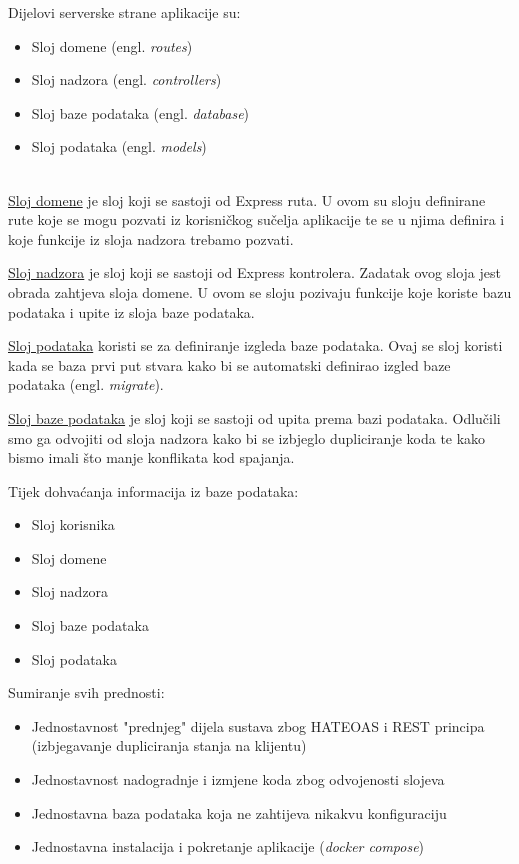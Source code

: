Dijelovi serverske strane aplikacije su:
\begin{itemize}
  \item Sloj domene (engl. \textit{routes})
  \item Sloj nadzora (engl. \textit{controllers})
  \item Sloj baze podataka (engl. \textit{database})
  \item Sloj podataka (engl. \textit{models})
\end{itemize}
\hfill
\\

\underline{Sloj domene} je sloj koji se sastoji od Express ruta. U ovom su sloju definirane rute koje se mogu pozvati iz korisničkog sučelja aplikacije te se u njima definira i koje funkcije iz sloja nadzora trebamo pozvati.\hfill \break

\underline{Sloj nadzora} je sloj koji se sastoji od Express kontrolera. Zadatak  ovog sloja jest obrada zahtjeva sloja domene. U ovom se sloju pozivaju funkcije koje koriste bazu podataka i upite iz sloja baze podataka.\hfill \break

\underline{Sloj podataka} koristi se za definiranje izgleda baze podataka. Ovaj se sloj koristi kada se baza prvi put stvara kako bi se automatski definirao izgled baze podataka (engl. \textit{migrate}).\hfill \break

\underline{Sloj baze podataka} je sloj koji se sastoji od upita prema bazi podataka. Odlučili smo ga odvojiti od sloja nadzora kako bi se izbjeglo dupliciranje koda te kako bismo imali što manje konflikata kod spajanja.\hfill \eject


Tijek dohvaćanja informacija iz baze podataka:
\begin{itemize}
	\item Sloj korisnika
	\item Sloj domene
	\item Sloj nadzora
	\item Sloj baze podataka
	\item Sloj podataka
  \end{itemize}

Sumiranje svih prednosti:
\begin{itemize}
  \item Jednostavnost "prednjeg" dijela sustava zbog HATEOAS i REST \newline principa (izbjegavanje dupliciranja stanja na klijentu)
  \item Jednostavnost nadogradnje i izmjene koda zbog odvojenosti slojeva
  \item Jednostavna baza podataka koja ne zahtijeva nikakvu konfiguraciju
  \item Jednostavna instalacija i pokretanje aplikacije (\textit{docker compose})
\end{itemize}


